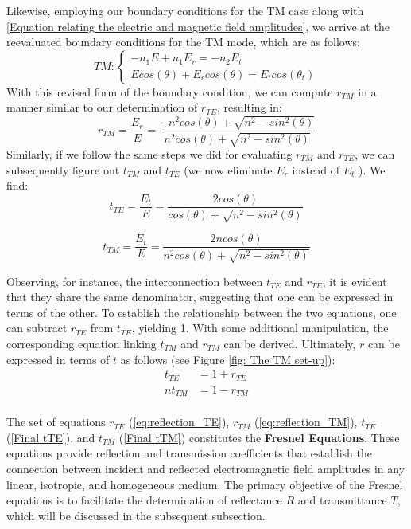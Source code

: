 Likewise, employing our boundary conditions for the TM case along with \ref{Equation relating the electric and magnetic field amplitudes}, we arrive at the reevaluated boundary conditions for the TM mode, which are as follows:
\begin{equation}
TM:
\begin{cases} \label{TM boundary conditions}
  -n_1E + n_1E_r = -n_2E_t \\
  Ecos(\theta) + E_rcos(\theta) = E_tcos(\theta_t)
\end{cases}
\end{equation}
With this revised form of the boundary condition, we can compute $r_{TM}$ in a manner similar to our determination of $r_{TE}$, resulting in:
\begin{equation} \label{eq:reflection_TM}
r_{TM} = \frac{E_r}{E} = \frac{-n^2cos(\theta) + \sqrt{n^2 - sin^2(\theta)}}{n^2cos(\theta) + \sqrt{n^2 - sin^2(\theta)}}
\end{equation}
Similarly, if we follow the same steps we did for evaluating $r_{TM}$ and $r_{TE}$, we can subsequently figure out $t_{TM}$ and $t_{TE}$ (we now eliminate $E_r$ instead of $E_t$ ). We find:
\begin{equation} \label{Final tTE}
t_{TE} = \frac{E_t}{E} = \frac{2cos(\theta)}{cos(\theta) + \sqrt{n^2 - sin^2(\theta)}}
\end{equation}

\begin{equation} \label{Final tTM}
t_{TM} = \frac{E_t}{E} = \frac{2ncos(\theta)}{n^2cos(\theta) + \sqrt{n^2 - sin^2(\theta)}}
\end{equation}

Observing, for instance, the interconnection between $t_{TE}$ and $r_{TE}$, it is evident that they share the same denominator, suggesting that one can be expressed in terms of the other. To establish the relationship between the two equations, one can subtract $r_{TE}$ from $t_{TE}$, yielding 1. With some additional manipulation, the corresponding equation linking $t_{TM}$ and $r_{TM}$ can be derived. Ultimately, $r$ can be expressed in terms of $t$ as follows (see Figure \ref{fig: The TM set-up}):
\begin{align*}
    t_{TE} &= 1 + r_{TE} \\
    nt_{TM} &= 1 - r_{TM} \\
\end{align*}

The set of equations $r_{TE}$ (\ref{eq:reflection_TE}), $r_{TM}$ (\ref{eq:reflection_TM}), $t_{TE}$ (\ref{Final tTE}), and $t_{TM}$ (\ref{Final tTM}) constitutes the \textbf{Fresnel Equations}. These equations provide reflection and transmission coefficients that establish the connection between incident and reflected electromagnetic field amplitudes in any linear, isotropic, and homogeneous medium. The primary objective of the Fresnel equations is to facilitate the determination of reflectance $R$ and transmittance $T$, which will be discussed in the subsequent subsection.

